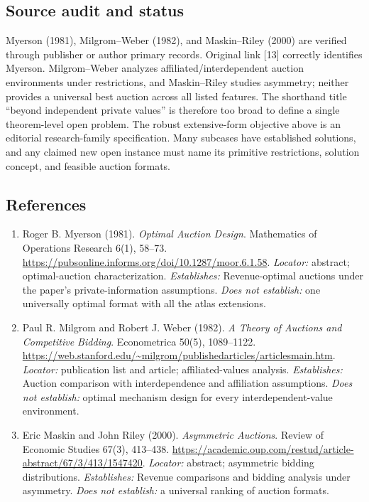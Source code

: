 \documentclass[11pt,a4paper]{article}
\begin{document}
\subsection*{Source audit and status}

Myerson (1981), Milgrom--Weber (1982), and Maskin--Riley (2000) are verified through publisher or author primary records. Original link [13] correctly identifies Myerson. Milgrom--Weber analyzes affiliated/interdependent auction environments under restrictions, and Maskin--Riley studies asymmetry; neither provides a universal best auction across all listed features. The shorthand title ``beyond independent private values'' is therefore too broad to define a single theorem-level open problem. The robust extensive-form objective above is an editorial research-family specification. Many subcases have established solutions, and any claimed new open instance must name its primitive restrictions, solution concept, and feasible auction formats.

\subsection*{References}

\begin{enumerate}

\item[S1] Roger B. Myerson (1981). \emph{Optimal Auction Design}. Mathematics of Operations Research 6(1), 58--73. \url{https://pubsonline.informs.org/doi/10.1287/moor.6.1.58}. \textit{Locator:} abstract; optimal-auction characterization. \textit{Establishes:} Revenue-optimal auctions under the paper's private-information assumptions. \textit{Does not establish:} one universally optimal format with all the atlas extensions.

\item[S2] Paul R. Milgrom and Robert J. Weber (1982). \emph{A Theory of Auctions and Competitive Bidding}. Econometrica 50(5), 1089--1122. \url{https://web.stanford.edu/~milgrom/publishedarticles/articlesmain.htm}. \textit{Locator:} publication list and article; affiliated-values analysis. \textit{Establishes:} Auction comparison with interdependence and affiliation assumptions. \textit{Does not establish:} optimal mechanism design for every interdependent-value environment.

\item[S3] Eric Maskin and John Riley (2000). \emph{Asymmetric Auctions}. Review of Economic Studies 67(3), 413--438. \url{https://academic.oup.com/restud/article-abstract/67/3/413/1547420}. \textit{Locator:} abstract; asymmetric bidding distributions. \textit{Establishes:} Revenue comparisons and bidding analysis under asymmetry. \textit{Does not establish:} a universal ranking of auction formats.

\end{enumerate}
\end{document}
